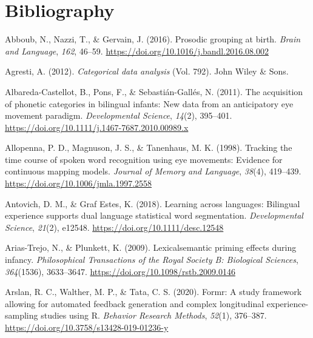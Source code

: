 \documentclass[
  12pt,
  b5paperpaper,
  twoside]{scrreprt}
\newlength{\cslhangindent}
\newlength{\cslentryspacingunit} %
\newenvironment{CSLReferences}[2] %
 {%
  \setlength{\parindent}{0pt}
  \ifodd #1
  \let\oldpar\par
  \def\par{\hangindent=\cslhangindent\oldpar}
  \fi
  \setlength{\parskip}{#2\cslentryspacingunit}
 }%
 {}
\begin{document}
\hypertarget{bibliography}{%
\chapter*{Bibliography}\label{bibliography}}


\begingroup

\hypertarget{refs}{}
\begin{CSLReferences}{1}{0}
\leavevmode{}%
Abboub, N., Nazzi, T., \& Gervain, J. (2016). Prosodic grouping at
birth. \emph{Brain and Language}, \emph{162}, 46--59.
\url{https://doi.org/10.1016/j.bandl.2016.08.002}

\leavevmode{}%
Agresti, A. (2012). \emph{Categorical data analysis} (Vol. 792). {John
Wiley \& Sons}.

\leavevmode{}%
Albareda-Castellot, B., Pons, F., \& Sebastián-Gallés, N. (2011). The
acquisition of phonetic categories in bilingual infants: New data from
an anticipatory eye movement paradigm. \emph{Developmental Science},
\emph{14}(2), 395--401.
\url{https://doi.org/10.1111/j.1467-7687.2010.00989.x}

\leavevmode{}%
Allopenna, P. D., Magnuson, J. S., \& Tanenhaus, M. K. (1998). Tracking
the time course of spoken word recognition using eye movements: Evidence
for continuous mapping models. \emph{Journal of Memory and Language},
\emph{38}(4), 419--439. \url{https://doi.org/10.1006/jmla.1997.2558}

\leavevmode{}%
Antovich, D. M., \& Graf Estes, K. (2018). Learning across languages:
Bilingual experience supports dual language statistical word
segmentation. \emph{Developmental Science}, \emph{21}(2), e12548.
\url{https://doi.org/10.1111/desc.12548}

\leavevmode{}%
Arias-Trejo, N., \& Plunkett, K. (2009). Lexical{\textendash}semantic
priming effects during infancy. \emph{Philosophical Transactions of the
Royal Society B: Biological Sciences}, \emph{364}(1536), 3633--3647.
\url{https://doi.org/10.1098/rstb.2009.0146}

\leavevmode{}%
Arslan, R. C., Walther, M. P., \& Tata, C. S. (2020). Formr: A study
framework allowing for automated feedback generation and complex
longitudinal experience-sampling studies using {R}. \emph{Behavior
Research Methods}, \emph{52}(1), 376--387.
\url{https://doi.org/10.3758/s13428-019-01236-y}


\end{CSLReferences}
\end{document}
